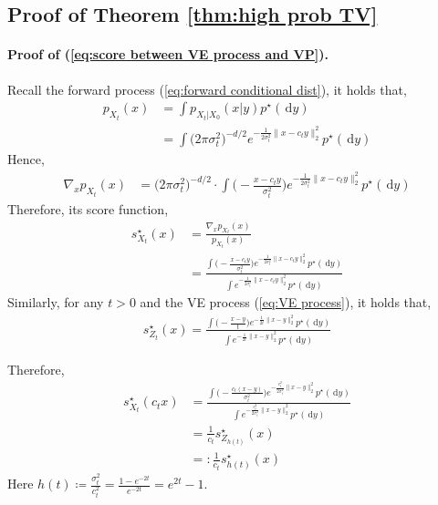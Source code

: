 \documentclass{article}
\newcommand{\defn}{\coloneqq}
\newcommand{\diff}{\,\mathrm{d}}
\theoremstyle{plain}
\theoremstyle{remark}
\begin{document}
\subsection{Proof of Theorem \ref{thm:high prob TV}}
\label{pf-of-thm:thm:high prob TV}
\paragraph*{Proof of (\ref{eq:score between VE process and VP}).}
Recall the forward process (\ref{eq:forward conditional dist}), it holds that, 
\begin{align*}
    p_{X_t}(x) &= \int p_{X_t|X_0}(x|y) p^\star(\! \diff y) \\
    &= \int \big(2\pi\sigma_t^2\big) ^{-d/2} e^{-\frac{1}{2\sigma_t^2}\|x-c_ty\|_2^2}p^\star( \! \diff y)
\end{align*}
Hence, 
\begin{align*}
    \nabla_x p_{X_t}(x)&= (2\pi\sigma_t^2\big) ^{-d/2}\cdot  \int \Big( -\frac{x-c_ty}{\sigma_t^2}\Big)e^{-\frac{1}{2\sigma_t^2}\|x-c_ty\|_2^2}p^\star(\! \diff y)
\end{align*}
Therefore, its score function, 
\begin{align*}
    s^\star_{X_t}(x)&= \frac{\nabla_xp_{X_t}(x)}{p_{X_t}(x)} \\
    &= \frac{\int \Big( -\frac{x-c_ty}{\sigma_t^2}\Big)e^{-\frac{1}{2\sigma_t^2}\|x-c_ty\|_2^2}p^\star(\! \diff y) }{\int  e^{-\frac{1}{2\sigma_t^2}\|x-c_ty\|_2^2}p^\star(\! \diff y)}
\end{align*}
Similarly, for any $t>0$ and the VE process (\ref{eq:VE process}), it holds that, 
\begin{align*}
    s^\star_{Z_t}(x) = \frac{\int \Big( -\frac{x-y}{t}\Big)e^{-\frac{1}{2t}\|x-y\|_2^2}p^\star(\! \diff y) }{\int  e^{-\frac{1}{2t}\|x-y\|_2^2}p^\star(\! \diff y)}
\end{align*}

Therefore, 
\begin{align*}
    s^\star_{X_t}(c_tx) &=  \frac{\int \Big( -\frac{c_t(x-y)}{\sigma_t^2}\Big)e^{-\frac{c_t^2}{2\sigma_t^2}\|x-y\|_2^2}p^\star(\! \diff y) }{\int  e^{-\frac{c_t^2}{2\sigma_t^2}\|x-y\|_2^2}p^\star(\! \diff y)}\\
    &= \frac{1}{c_t}s^\star_{Z_{h(t)}}(x) \\
    &=: \frac{1}{c_t}s^\star_{h(t)}(x)
\end{align*}
Here $h(t)\defn \frac{\sigma_t^2}{c_t^2} = \frac{1-e^{-2t}}{e^{-2t}} = e^{2t}-1$. 
\end{document}
